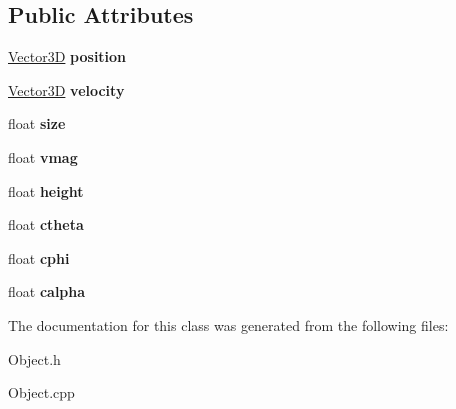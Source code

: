 \subsection*{\-Public \-Attributes}
\begin{DoxyCompactItemize}
\item 
\hypertarget{classObject_a29e36d71a7302f40368ce9e01b2a4822}{\hyperlink{classVector3D}{\-Vector3\-D} {\bfseries position}}\label{classObject_a29e36d71a7302f40368ce9e01b2a4822}

\item 
\hypertarget{classObject_a5a30e6a262f5e866817ec68e6d0bb40c}{\hyperlink{classVector3D}{\-Vector3\-D} {\bfseries velocity}}\label{classObject_a5a30e6a262f5e866817ec68e6d0bb40c}

\item 
\hypertarget{classObject_a943828436a63520b4059b749df5564c3}{float {\bfseries size}}\label{classObject_a943828436a63520b4059b749df5564c3}

\item 
\hypertarget{classObject_ab8aba4ed9bf13048ff8c03c026ce3bea}{float {\bfseries vmag}}\label{classObject_ab8aba4ed9bf13048ff8c03c026ce3bea}

\item 
\hypertarget{classObject_a91cd011fc7b03ae185983737e3d4285c}{float {\bfseries height}}\label{classObject_a91cd011fc7b03ae185983737e3d4285c}

\item 
\hypertarget{classObject_a7d93834fcf0e6c19f49861571b6f35e7}{float {\bfseries ctheta}}\label{classObject_a7d93834fcf0e6c19f49861571b6f35e7}

\item 
\hypertarget{classObject_ac87a05f7ba522e755e5f913ad62acb16}{float {\bfseries cphi}}\label{classObject_ac87a05f7ba522e755e5f913ad62acb16}

\item 
\hypertarget{classObject_aa2bb18132180e330ec20305534c57b58}{float {\bfseries calpha}}\label{classObject_aa2bb18132180e330ec20305534c57b58}

\end{DoxyCompactItemize}


\-The documentation for this class was generated from the following files\-:\begin{DoxyCompactItemize}
\item 
\-Object.\-h\item 
\-Object.\-cpp\end{DoxyCompactItemize}
